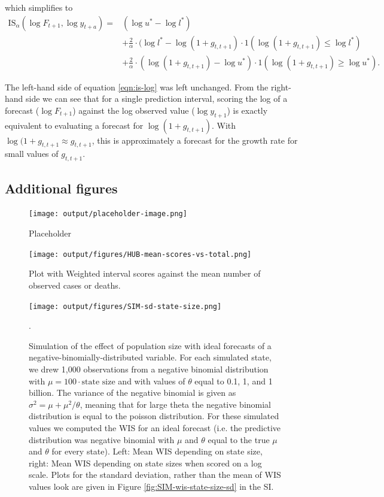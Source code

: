 \documentclass{article}
\begin{document}
%
which simplifies to 
%
\begin{equation}
\begin{aligned}
\label{eqn:is-log}
\text{IS}_\alpha(\log F_{t+1}, \log y_{t+a}) = &(\log u^* - \log l^*) \\
&+ \frac{2}{\alpha} \cdot (\log l^* - \log (1 + g_{t, t+1}) 
     \cdot 1(\log (1 + g_{t, t+1}) \leq \log l^*) \\
&+ \frac{2}{\alpha} \cdot (\log (1 + g_{t, t+1}) - \log u^*) 
      \cdot 1(\log (1 + g_{t, t+1}) \geq \log u^*).
\end{aligned}
\end{equation}

The left-hand side of equation \ref{eqn:is-log} was left unchanged. From the right-hand side we can see that for a single prediction interval, scoring the log of a forecast ($\log F_{t+1}$) against the log observed value ($\log y_{t+1}$) is exactly equivalent to evaluating a forecast for $\log (1 + g_{t, t+1})$. With $\log (1 + g_{t, t+1} \approx g_{t, t+1}$, this is approximately a forecast for the growth rate for small values of $g_{t, t+1}$. 


\subsection{Additional figures}




\begin{figure}[h!]
    \centering
    \texttt{[image: output/placeholder-image.png]}
    \caption{Placeholder}
    \label{fig:placeholder}
\end{figure}


\begin{figure}[h!]
    \centering
    \texttt{[image: output/figures/HUB-mean-scores-vs-total.png]}
    \caption{Plot with Weighted interval scores against the mean number of observed cases or deaths.}
    \label{fig:HUB-mean-scores-total}
\end{figure}

\begin{figure}[h!]
    \centering
    \texttt{[image: output/figures/SIM-sd-state-size.png]}
    \caption{Simulation of the effect of population size with ideal forecasts of a negative-binomially-distributed variable. For each simulated state, we drew 1,000 observations from a negative binomial distribution with $\mu = 100 \cdot \text{state size}$ and with values of $\theta$ equal to 0.1, 1, and 1 billion. The variance of the negative binomial is given as $\sigma^2 = \mu + \mu^2 / \theta$, meaning that for large theta the negative binomial distribution is equal to the poisson distribution. For these simulated values we computed the WIS for an ideal forecast (i.e. the predictive distribution was negative binomial with $\mu$ and $\theta$ equal to the true $\mu$ and $\theta$ for every state). Left: Mean WIS depending on state size, right: Mean WIS depending on state sizes when scored on a log scale. Plots for the standard deviation, rather than the mean of WIS values look are given in Figure \ref{fig:SIM-wis-state-size-sd} in the SI.}. 
    \label{fig:SIM-wis-state-size-mean}
\end{figure}



\end{document}
